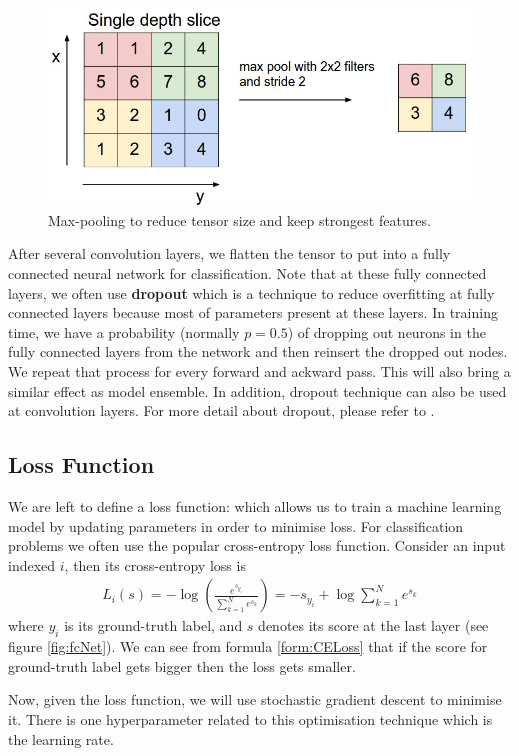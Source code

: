\begin{figure}[tb]
	\centering
	\includegraphics[width=0.6\hsize]{./figures/maxpool}
	\caption{Max-pooling to reduce tensor size and keep strongest features.}
	\label{fig:maxpool}
\end{figure}
After several convolution layers, we flatten the tensor to put into a fully connected neural network for classification. Note that at these fully connected layers, we often use \textbf{dropout} which is a technique to reduce overfitting at fully connected layers because most of parameters present at these layers. In training time, we have a probability (normally $p=0.5$) of dropping out neurons in the fully connected layers from the network and then reinsert the dropped out nodes. We repeat that process for every forward and ackward pass. This will also bring a similar effect as model ensemble. In addition, dropout technique can also be used at convolution layers. For more detail about dropout, please refer to \cite{Srivastava:2014:DSW:2627435.2670313}.

\subsection{Loss Function}
We are left to define a loss function: which allows us to train a machine learning model by updating parameters in order to minimise loss. For classification problems we often use the popular cross-entropy loss function. Consider an input indexed $i$, then its cross-entropy loss is
\begin{align}
\label{form:CELoss}
L_i(s) = -\log(\frac{e^{s_{y_i}}}{\sum_{k=1}^{N}e^{s_k}}) = -s_{y_i} + \log\sum_{k=1}^{N}e^{s_k}
\end{align}
where $y_i$ is its ground-truth label, and $s$ denotes its score at the last layer (see figure \ref{fig:fcNet}). We can see from formula \ref{form:CELoss} that if the score for ground-truth label gets bigger then the loss gets smaller.

Now, given the loss function, we will use stochastic gradient descent to minimise it. There is one hyperparameter related to this optimisation technique which is the learning rate.

